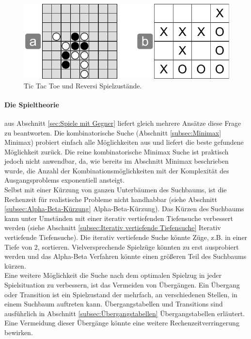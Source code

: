 \begin{figure}[!htbp]
  \centering
  \includegraphics[scale = 0.8]{inhalt/abbildungen/reversi_und_tictactoe.pdf}
  \caption{Tic Tac Toe und Reversi Spielzustände.}
  \label{fig:reversi_und_tictactoe}
\end{figure} 

\paragraph{Die Spieltheorie} aus Abschnitt \ref{sec:Spiele mit Gegner} liefert gleich mehrere Ansätze diese Frage zu beantworten. Die kombinatorische Suche (Abschnitt \ref{subsec:Minimax} Minimax) probiert einfach alle Möglichkeiten aus und liefert die beste gefundene Möglichkeit zurück. Die reine kombinatorische Minimax Suche ist praktisch jedoch nicht anwendbar, da, wie bereits im Abschnitt Minimax beschrieben wurde, die Anzahl der Kombinationsmöglichkeiten mit der Komplexität des Ausgangsproblems exponentiell ansteigt. \\

Selbst mit einer Kürzung von ganzen Unterbäumen des Suchbaums, ist die Rechenzeit für realistische Probleme nicht handhabbar (siehe Abschnitt \ref{subsec:Alpha-Beta-Kürzung} Alpha-Beta-Kürzung). Das Kürzen des Suchbaums kann unter Umständen mit einer iterativ vertiefenden Tiefensuche verbessert werden (siehe Abschnitt \ref{subsec:Iterativ vertiefende Tiefensuche} Iterativ vertiefende Tiefensuche). Die iterativ vertiefende Suche könnte Züge, z.B. in einer Tiefe von 2, sortieren. Vielversprechende Spielzüge könnten zu erst ausprobiert werden und das Alpha-Beta Verfahren könnte einen größeren Teil des Suchbaums kürzen. \\

Eine weitere Möglichkeit die Suche nach dem optimalen Spielzug in jeder Spielsituation zu verbessern, ist das Vermeiden von Übergängen. Ein Übergang oder Transition ist ein Spielzustand der mehrfach, an verschiedenen Stellen, in einem Suchbaum auftreten kann. Übergangstabellen und Transitions sind ausführlich in Abschnitt \ref{subsec:Übergangstabellen} Übergangstabellen erläutert. Eine Vermeidung dieser Übergänge könnte eine weitere Rechenzeitverringerung bewirken. \\

